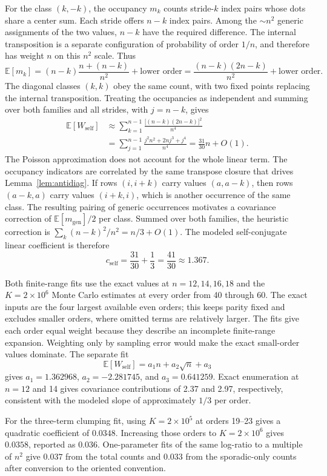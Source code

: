 \documentclass[11pt]{article}
\begin{document}
For the class $(k,-k)$, the occupancy $m_k$ counts stride-$k$ index pairs
whose dots share a center sum.  Each stride offers $n-k$ index pairs.
Among the $\sim n^2$ generic assignments of the two values, $n-k$ have
the required difference.  The internal transposition is a separate
configuration of probability of order $1/n$, and therefore has weight $n$
on this $n^2$ scale.  Thus
\[
\mathbb{E}[m_k]
=(n-k)\frac{n+(n-k)}{n^{2}}+\text{lower order}
=\frac{(n-k)(2n-k)}{n^{2}}+\text{lower order}.
\]
The diagonal classes $(k,k)$ obey the same count, with two fixed points
replacing the internal transposition.  Treating the occupancies as independent
and summing over both families and all strides, with $j=n-k$, gives
\begin{align*}
\mathbb{E}[W_{\mathrm{self}}]
&\approx \sum_{k=1}^{n-1}\frac{\bigl[(n-k)(2n-k)\bigr]^{2}}{n^{4}}\\
&=\sum_{j=1}^{n-1}\frac{j^{2}n^{2}+2nj^{3}+j^{4}}{n^{4}}
=\frac{31}{30}n+O(1).
\end{align*}
The Poisson approximation does not account for the whole linear term.
The occupancy indicators are correlated by the same transpose closure
that drives Lemma~\ref{lem:antidiag}.  If rows $(i,i+k)$ carry values
$(a,a-k)$, then rows $(a-k,a)$ carry values $(i+k,i)$, which is another
occurrence of the same class.  The resulting pairing of generic
occurrences motivates a covariance correction of
$\mathbb{E}[m_{\mathrm{gen}}]/2$ per class.  Summed over both families,
the heuristic correction is
$\sum_k(n-k)^2/n^2=n/3+O(1)$.  The modeled self-conjugate linear
coefficient is therefore
\[
c_{\mathrm{self}}=\frac{31}{30}+\frac13=\frac{41}{30}\approx1.367.
\]

Both finite-range fits use the exact values at $n=12,14,16,18$ and the
$K=2\times10^6$ Monte Carlo estimates at every order from 40 through 60.
The exact inputs are the four largest available even orders; this keeps
parity fixed and excludes smaller orders, where omitted terms are relatively
larger.  The fits give each order equal weight because they describe an
incomplete finite-range expansion.  Weighting only by sampling error would
make the exact small-order values dominate.  The separate fit
\[
\mathbb{E}[W_{\mathrm{self}}]=a_1n+a_2\sqrt n+a_3
\]
gives $a_1=1.362968$, $a_2=-2.281745$, and $a_3=0.641259$.  Exact
enumeration at $n=12$ and 14 gives covariance contributions of 2.37 and
2.97, respectively, consistent with the modeled slope of approximately
$1/3$ per order.

For the three-term clumping fit, using $K=2\times10^5$ at orders 19--23
gives a quadratic coefficient of $0.0348$.  Increasing those orders to
$K=2\times10^6$ gives $0.0358$, reported as $0.036$.  One-parameter fits
of the same log-ratio to a multiple of $n^2$ give $0.037$ from the total
counts and $0.033$ from the sporadic-only counts after conversion to the
oriented convention.
\end{document}
